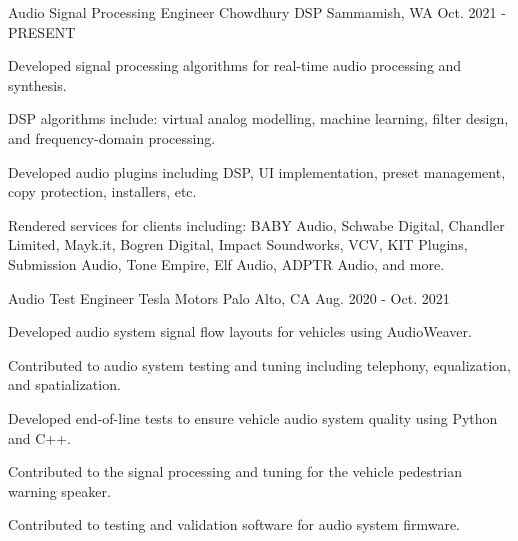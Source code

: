 

\begin{cventries}

  \cventry
    {Audio Signal Processing Engineer} %
    {Chowdhury DSP} %
    {Sammamish, WA} %
    {Oct. 2021 - PRESENT} %
    {
      \begin{cvitems} %
        \item {Developed signal processing algorithms for real-time audio processing and synthesis.}
        \item {DSP algorithms include: virtual analog modelling, machine learning, filter design, and frequency-domain processing.}
        \item {Developed audio plugins including DSP, UI implementation, preset management, copy protection, installers, etc.}
        \item {Rendered services for clients including: BABY Audio, Schwabe Digital, Chandler Limited, Mayk.it, Bogren Digital, Impact Soundworks,
        VCV, KIT Plugins, Submission Audio, Tone Empire, Elf Audio, ADPTR Audio, and more.}
      \end{cvitems}
    }

  \cventry
    {Audio Test Engineer} %
    {Tesla Motors} %
    {Palo Alto, CA} %
    {Aug. 2020 - Oct. 2021} %
    {
      \begin{cvitems} %
        \item {Developed audio system signal flow layouts for vehicles using AudioWeaver.}
        \item {Contributed to audio system testing and tuning including telephony, equalization, and spatialization.}
        \item {Developed end-of-line tests to ensure vehicle audio system quality using Python and C++.}
        \item {Contributed to the signal processing and tuning for the vehicle pedestrian warning speaker.}
        \item {Contributed to testing and validation software for audio system firmware.}
      \end{cvitems}
    }


\end{cventries}
